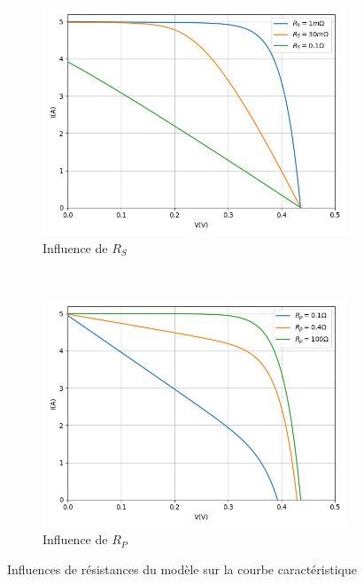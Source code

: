 \begin{figure}
  \begin{subfigure}[b]{.48\textwidth}
    \begin{center}
      \includegraphics[width=\textwidth]{resources/rsinf.png}
      \caption{Influence de $R_S$}
    \end{center}
  \end{subfigure}
  ~
  \begin{subfigure}[b]{.48\textwidth}
    \begin{center}
      \includegraphics[width=\textwidth]{resources/rpinf.png}
      \caption{Influence de $R_P$}
    \end{center}
  \end{subfigure}
  \caption{Influences de résistances du modèle sur la courbe caractéristique}
  \label{fig:rinf}
\end{figure}


